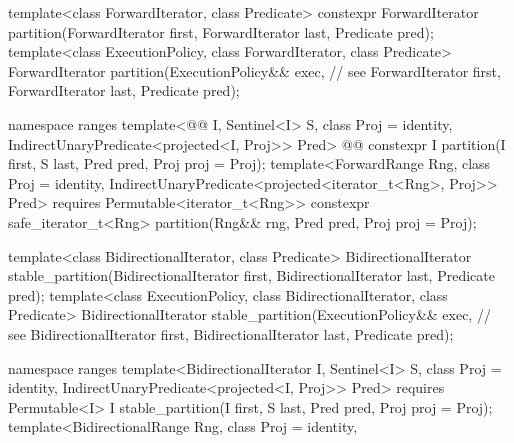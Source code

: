 \begin{codeblock}
  template<class ForwardIterator, class Predicate>
    constexpr ForwardIterator partition(ForwardIterator first,
                                        ForwardIterator last,
                                        Predicate pred);
  template<class ExecutionPolicy, class ForwardIterator, class Predicate>
    ForwardIterator partition(ExecutionPolicy&& exec, // see 
                              ForwardIterator first,
                              ForwardIterator last,
                              Predicate pred);
\end{codeblock}\begin{addedblock}\begin{codeblock}
  namespace ranges {
    template<@@ I, Sentinel<I> S, class Proj = identity,
        IndirectUnaryPredicate<projected<I, Proj>> Pred>
      @@
      constexpr I
        partition(I first, S last, Pred pred, Proj proj = Proj{});
    template<ForwardRange Rng, class Proj = identity,
        IndirectUnaryPredicate<projected<iterator_t<Rng>, Proj>> Pred>
      requires Permutable<iterator_t<Rng>>
      constexpr safe_iterator_t<Rng>
        partition(Rng&& rng, Pred pred, Proj proj = Proj{});
  }
\end{codeblock}\end{addedblock}\begin{codeblock}
  template<class BidirectionalIterator, class Predicate>
    BidirectionalIterator stable_partition(BidirectionalIterator first,
                                           BidirectionalIterator last,
                                           Predicate pred);
  template<class ExecutionPolicy, class BidirectionalIterator, class Predicate>
    BidirectionalIterator stable_partition(ExecutionPolicy&& exec, // see 
                                           BidirectionalIterator first,
                                           BidirectionalIterator last,
                                           Predicate pred);
\end{codeblock}\begin{addedblock}\begin{codeblock}
  namespace ranges {
    template<BidirectionalIterator I, Sentinel<I> S, class Proj = identity,
        IndirectUnaryPredicate<projected<I, Proj>> Pred>
      requires Permutable<I>
      I stable_partition(I first, S last, Pred pred, Proj proj = Proj{});
    template<BidirectionalRange Rng, class Proj = identity,
}
\end{codeblock}
\end{addedblock}
